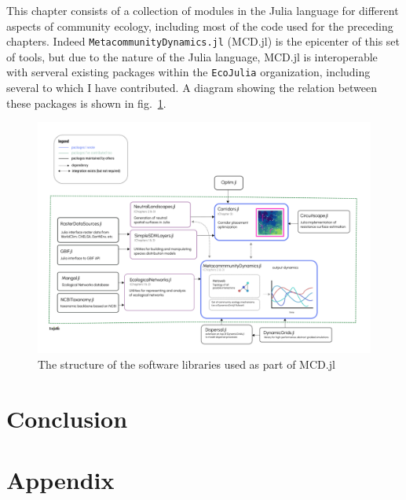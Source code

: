 \documentclass[11pt]{article}
\makeatletter
\def\maxwidth{\ifdim\Gin@nat@width>\linewidth\linewidth
\else\Gin@nat@width\fi}
\let\Oldincludegraphics\includegraphics
\renewcommand{\includegraphics}[1]{\Oldincludegraphics[width=\maxwidth]{#1}}
\makeatother
\begin{document}
This chapter consists of a collection of modules in the Julia language
for different aspects of community ecology, including most of the code
used for the preceding chapters. Indeed
\texttt{MetacommunityDynamics.jl} (MCD.jl) is the epicenter of this set
of tools, but due to the nature of the Julia language, MCD.jl is
interoperable with serveral existing packages within the
\texttt{EcoJulia} organization, including several to which I have
contributed. A diagram showing the relation between these packages is
shown in fig.~\ref{fig:software}.

\begin{figure}
\hypertarget{fig:software}{%
\centering
\includegraphics{./figures/ch4.png}
\caption{The structure of the software libraries used as part of
MCD.jl}\label{fig:software}
}
\end{figure}

\hypertarget{conclusion}{%
\section{Conclusion}\label{conclusion}}

\hypertarget{appendix}{%
\section{Appendix}\label{appendix}}
\end{document}
